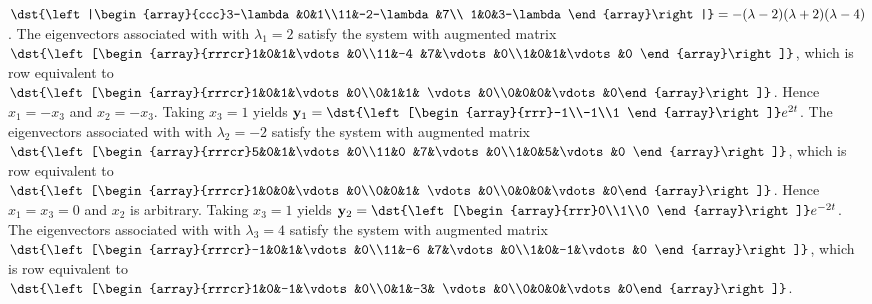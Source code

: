 \documentclass[dvips]{book}
\renewcommand{\exer}[1]{\par\medskip\;\noindent{\color{red}\bf #1.}}
\numberwithin{example}{section}
\numberwithin{equation}{section}
\numberwithin{theorem}{section}
\numberwithin{table}{section}
\numberwithin{figure}{section}
\begin{document}
\exer{10.4.24}
$\dst{\left|\begin{array}{ccc}3-\lambda&0&1\\11&-2-\lambda&7\\
1&0&3-\lambda\end{array}\right|}=-(\lambda-2)(\lambda+2)(\lambda-4)$.
The eigenvectors associated with
 with $\lambda_1=2$ satisfy the system with  augmented matrix
$\dst{\left[\begin{array}{rrrcr}1&0&1&\vdots&0\\11&-4
&7&\vdots&0\\1&0&1&\vdots&0
\end{array}\right]}$,
which is row equivalent to
$\dst{\left[\begin{array}{rrrcr}1&0&1&\vdots&0\\0&1&1&
\vdots&0\\0&0&0&\vdots&0\end{array}\right]}$.
Hence $x_1=-x_3$ and $x_2=-x_3$.  Taking $x_3=1$ yields
${\bf y}_1=\dst{\left[\begin{array}{rrr}-1\\-1\\1
\end{array}\right]}e^{2t}$.
The eigenvectors associated with
 with $\lambda_2=-2$ satisfy the system with  augmented matrix
$\dst{\left[\begin{array}{rrrcr}5&0&1&\vdots&0\\11&0
&7&\vdots&0\\1&0&5&\vdots&0
\end{array}\right]}$,
which is row equivalent to
$\dst{\left[\begin{array}{rrrcr}1&0&0&\vdots&0\\0&0&1&
\vdots&0\\0&0&0&\vdots&0\end{array}\right]}$.
Hence $x_1=x_3=0$ and $x_2$ is arbitrary.  Taking $x_3=1$ yields
${\bf y}_2=\dst{\left[\begin{array}{rrr}0\\1\\0
\end{array}\right]}e^{-2t}$.
The eigenvectors associated with
 with $\lambda_3=4$ satisfy the system with  augmented matrix
$\dst{\left[\begin{array}{rrrcr}-1&0&1&\vdots&0\\11&-6
&7&\vdots&0\\1&0&-1&\vdots&0
\end{array}\right]}$,
which is row equivalent to
$\dst{\left[\begin{array}{rrrcr}1&0&-1&\vdots&0\\0&1&-3&
\vdots&0\\0&0&0&\vdots&0\end{array}\right]}$.
\end{document}
